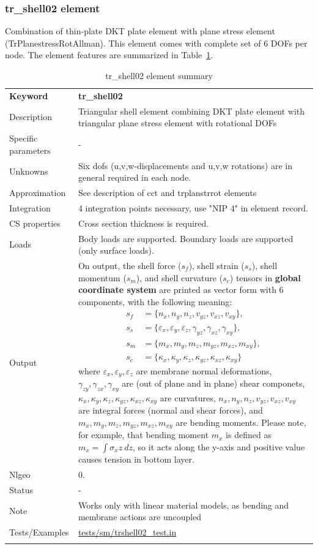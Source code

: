 \documentclass[a4paper]{article}
\newcommand{\param}[1]{\texttt{#1}} %
\newcommand{\templabel}{}%
\newcommand{\tempcaption}{}%
\newcounter{nelpar}
\newenvironment{elementsummary}[5]{%
  \gdef\tempcaption{#4}%
  \gdef\templabel{#5}%
  \setcounter{nelpar}{0}%
  \begin{center} %
    \begin{table}[!htb] %
      \begin{tabular}{|l|p{9cm}|}\hline %
        {\bf Keyword} & \bf{#1}\\ %
        {Description} & {#2}\\ %
        {Specific parameters} & {#3}\\ \hline %
}{
  \\ \hline %
      \end{tabular}%
      \caption{\tempcaption}%
      \label{\templabel}%
    \end{table}%
  \end{center}%
}
\newcommand{\elementParam}[1]{%
  \ifthenelse{\value{nelpar}>0} %
             {&{#1}}%
             {\setcounter{nelpar}{1}Parameters&{#1}}%
             \\%
}
\newcommand{\elementDescription}[2]{{#1} & {#2}\\}
\begin{document}
\subsubsection {tr\_shell02 element}
Combination of thin-plate DKT plate element with plane stress element (TrPlanestressRotAllman). This element comes with complete set of 6 DOFs per node. 
The element features are summarized in Table~\ref{trshell02summary}.

\begin{elementsummary}{tr\_shell02}{Triangular shell element combining DKT plate element with triangular plane stress element with rotational DOFs}{-}{tr\_shell02 element summary}{trshell02summary}
\elementDescription{Unknowns}{Six dofs (u,v,w-displacements and u,v,w rotations) are in general required in each node.}
\elementDescription{Approximation}{See description of cct and trplanstrrot elements}
\elementDescription{Integration}{4 integration points necessary, use "NIP 4" in element record.}
\elementDescription{CS properties}{Cross section thickness is required.}
\elementDescription{Loads}{Body loads are supported. Boundary loads are supported (only surface loads).}
\elementDescription{Output}{On output, the shell force ($s_f$), shell strain ($s_s$), shell momentum ($s_m$), and shell curvature ($s_c$) tensors in \textbf{global coordinate system} are printed as vector form with 6 components, with the following meaning:
\begin{align*}
s_f &= \{n_x, n_y, n_z, v_{yz}, v_{xz}, v_{xy}\},\\
s_s &= \{\varepsilon_x, \varepsilon_y, \varepsilon_z, \gamma_{yz}, \gamma_{xz}, \gamma_{xy}\},\\
s_m &= \{m_x, m_y, m_z, m_{yz}, m_{xz}, m_{xy}\},\\
s_c &= \{\kappa_x, \kappa_y, \kappa_z, \kappa_{yz}, \kappa_{xz}, \kappa_{xy}\}
\end{align*}
where $\varepsilon_x, \varepsilon_y, \varepsilon_z$ are membrane normal deformations, $\gamma_{zy}, \gamma_{zx}, \gamma_{xy}$ are (out of plane and in plane) shear componets, $\kappa_x, \kappa_y, \kappa_z, \kappa_{yz}, \kappa_{xz}, \kappa_{xy}$ are curvatures, $n_x, n_y, n_z, v_{yz}, v_{xz}, v_{xy}$ are integral forces (normal and shear forces), and $m_x, m_y, m_z, m_{yz}, m_{xz}, m_{xy}$ are bending moments. 
Please note, for example, that bending moment $m_x$ is defined as $m_x=\int \sigma_x z\ dz$, so it acts along the y-axis and positive value causes tension in bottom layer.}
\elementDescription{Nlgeo}{0.}
\elementDescription{Status}{-}
\elementDescription{Note}{Works only with linear material models, as bending and membrane actions are uncoupled}
\elementDescription{Tests/Examples}{\href{https://github.com/oofem/oofem/blob/devel/tests/sm/trshell02\_test.in}{tests/sm/trshell02\_test.in}}
\end{elementsummary}
\end{document}
